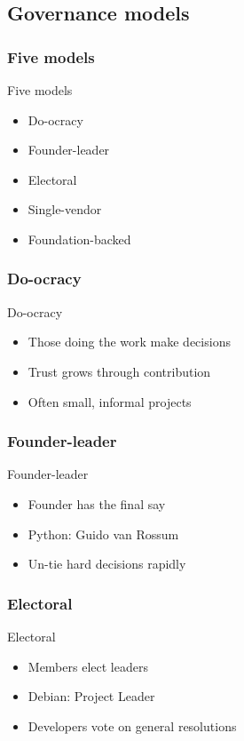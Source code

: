 \documentclass[aspectratio=169]{beamer}
\begin{document}
\subsection{Governance models}
\subsubsection{Five models}
\begin{frame}{Five models}
  \Large
  \begin{itemize}
    \item Do-ocracy
    \item Founder-leader
    \item Electoral
    \item Single-vendor
    \item Foundation-backed
  \end{itemize}
\end{frame}

\subsubsection{Do-ocracy}
\begin{frame}{Do-ocracy}
  \Large
  \begin{itemize}
    \setlength{\itemsep}{1em}
    \item Those doing the work make decisions
    \item Trust grows through contribution
    \item Often small, informal projects
  \end{itemize}
\end{frame}

\subsubsection{Founder-leader}
\begin{frame}{Founder-leader}
  \Large
  \begin{itemize}
    \setlength{\itemsep}{1em}
    \item Founder has the final say
    \item Python: Guido van Rossum
    \item Un-tie hard decisions rapidly
  \end{itemize}
\end{frame}

\subsubsection{Electoral}
\begin{frame}{Electoral}
  \Large
  \begin{itemize}
    \setlength{\itemsep}{1em}
    \item Members elect leaders
    \item Debian: Project Leader
    \item Developers vote on general resolutions
  \end{itemize}
\end{frame}
\end{document}
